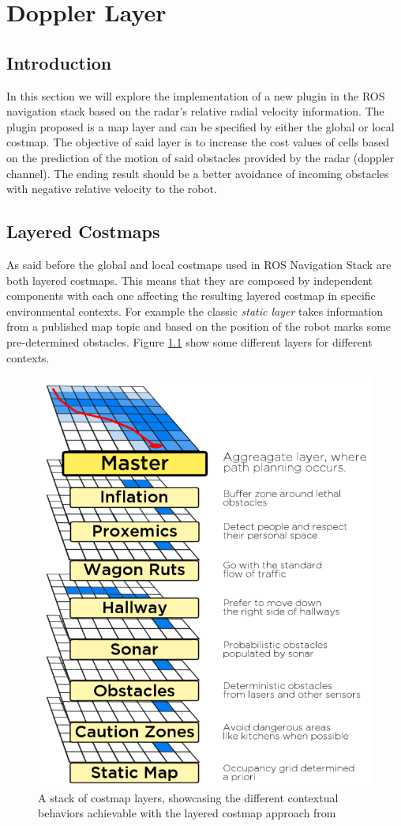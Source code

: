 \chapter{Doppler Layer}

\section{Introduction}
In this section we will explore the implementation of a new plugin in the ROS navigation stack based on the radar's relative radial velocity information. The plugin proposed is a map layer and can be specified by either the global or local costmap. The objective of said layer is to increase the cost values of cells based on the prediction of the motion of said obstacles provided by the radar (doppler channel). The ending result should be a better avoidance of incoming obstacles with negative relative velocity  to the robot.

\section{Layered Costmaps}
As said before the global and local costmaps used in \ac{ROS} Navigation Stack are both layered costmaps.
This means that they are composed by independent components with each one affecting the resulting layered costmap in specific environmental contexts. For example the classic \textit{static layer} takes information from a published map topic and based on the position of the robot marks some  pre-determined obstacles.  Figure \ref{fig::layers} show some different layers for different contexts.
\begin{figure}[h] 
\centerline{\includegraphics [width=0.5 \textwidth]{imgs/chapter6/layers.png}}
\caption{A stack of costmap layers, showcasing the different contextual
behaviors achievable with the layered costmap approach from \cite{lu2014layered}}
\label{fig::layers}
\end{figure}

